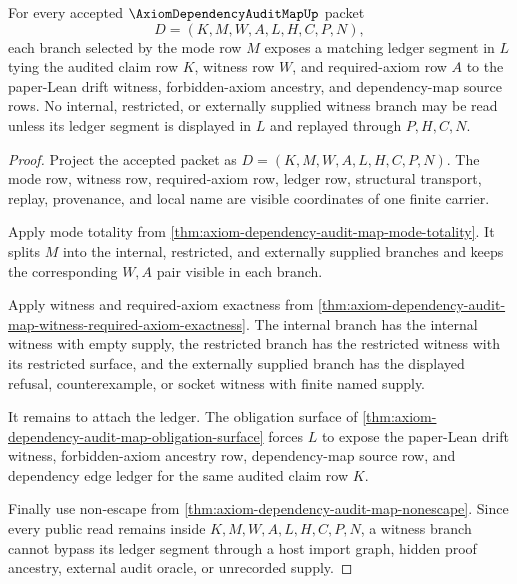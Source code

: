 \begin{theorem}
\label{thm:axiom-dependency-audit-map-witness-ledger-totality}
For every accepted $\AxiomDependencyAuditMapUp$ packet
$$
D=(K,M,W,A,L,H,C,P,N),
$$
each branch selected by the mode row $M$ exposes a matching ledger segment in $L$ tying the audited claim row $K$, witness row $W$, and required-axiom row $A$ to the paper-Lean drift witness, forbidden-axiom ancestry, and dependency-map source rows. No internal, restricted, or externally supplied witness branch may be read unless its ledger segment is displayed in $L$ and replayed through $P,H,C,N$.
\end{theorem}
\begin{proof}
Project the accepted packet as $D=(K,M,W,A,L,H,C,P,N)$. The mode row, witness row, required-axiom row, ledger row, structural transport, replay, provenance, and local name are visible coordinates of one finite carrier.

Apply mode totality from \autoref{thm:axiom-dependency-audit-map-mode-totality}. It splits $M$ into the internal, restricted, and externally supplied branches and keeps the corresponding $W,A$ pair visible in each branch.

Apply witness and required-axiom exactness from \autoref{thm:axiom-dependency-audit-map-witness-required-axiom-exactness}. The internal branch has the internal witness with empty supply, the restricted branch has the restricted witness with its restricted surface, and the externally supplied branch has the displayed refusal, counterexample, or socket witness with finite named supply.

It remains to attach the ledger. The obligation surface of \autoref{thm:axiom-dependency-audit-map-obligation-surface} forces $L$ to expose the paper-Lean drift witness, forbidden-axiom ancestry row, dependency-map source row, and dependency edge ledger for the same audited claim row $K$.

Finally use non-escape from \autoref{thm:axiom-dependency-audit-map-nonescape}. Since every public read remains inside $K,M,W,A,L,H,C,P,N$, a witness branch cannot bypass its ledger segment through a host import graph, hidden proof ancestry, external audit oracle, or unrecorded supply.
\end{proof}

